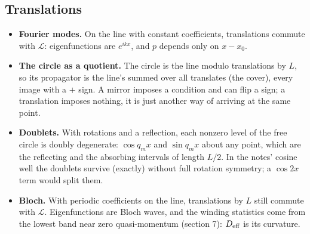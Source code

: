 \documentclass[11pt]{article}
\newcommand{\Lop}{\mathcal{L}}
\begin{document}
\subsection{Translations}
\begin{itemize}
  \item \textbf{Fourier modes.} On the line with constant coefficients, translations commute with $\Lop$: eigenfunctions
        are $e^{ikx}$, and $p$ depends only on $x-x_0$.
  \item \textbf{The circle as a quotient.} The circle is the line modulo translations by $L$, so its propagator is the line's
        summed over all translates (the cover), every image with a $+$ sign. A mirror imposes a condition and can flip a
        sign; a translation imposes nothing, it is just another way of arriving at the same point.
  \item \textbf{Doublets.} With rotations and a reflection, each nonzero level of the free circle is doubly degenerate:
        $\cos q_mx$ and $\sin q_mx$ about any point, which are the reflecting and the absorbing intervals of length $L/2$.
        In the notes' cosine well the doublets survive (exactly) without full rotation symmetry; a $\cos2x$ term would split
        them.
  \item \textbf{Bloch.} With periodic coefficients on the line, translations by $L$ still commute with $\Lop$. Eigenfunctions
        are Bloch waves, and the winding statistics come from the lowest band near zero quasi-momentum (section 7):
        $D_{\rm eff}$ is its curvature.
\end{itemize}
\end{document}
